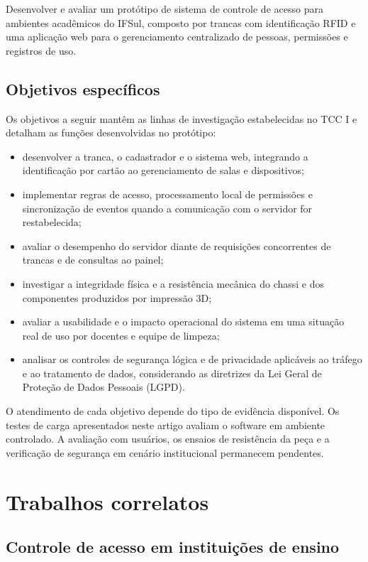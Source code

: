 \documentclass[12pt]{article}
\begin{document}
Desenvolver e avaliar um protótipo de sistema de controle de acesso para ambientes acadêmicos do IFSul, composto por trancas com identificação RFID e uma aplicação web para o gerenciamento centralizado de pessoas, permissões e registros de uso.

\subsection{Objetivos específicos}

Os objetivos a seguir mantêm as linhas de investigação estabelecidas no TCC I e detalham as funções desenvolvidas no protótipo:

\begin{itemize}
  \item desenvolver a tranca, o cadastrador e o sistema web, integrando a identificação por cartão ao gerenciamento de salas e dispositivos;
  \item implementar regras de acesso, processamento local de permissões e sincronização de eventos quando a comunicação com o servidor for restabelecida;
  \item avaliar o desempenho do servidor diante de requisições concorrentes de trancas e de consultas ao painel;
  \item investigar a integridade física e a resistência mecânica do chassi e dos componentes produzidos por impressão 3D;
  \item avaliar a usabilidade e o impacto operacional do sistema em uma situação real de uso por docentes e equipe de limpeza;
  \item analisar os controles de segurança lógica e de privacidade aplicáveis ao tráfego e ao tratamento de dados, considerando as diretrizes da Lei Geral de Proteção de Dados Pessoais (LGPD).
\end{itemize}

O atendimento de cada objetivo depende do tipo de evidência disponível. Os testes de carga apresentados neste artigo avaliam o software em ambiente controlado. A avaliação com usuários, os ensaios de resistência da peça e a verificação de segurança em cenário institucional permanecem pendentes.

\section{Trabalhos correlatos}

\subsection{Controle de acesso em instituições de ensino}
\end{document}
